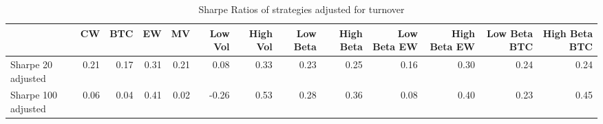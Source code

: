 \begin{table}
\centering
\caption{Sharpe Ratios of strategies adjusted for turnover}
\label{sharpe}
\begin{tabular}{lrrrrrrrrrrrr}
\toprule
{} &   CW &  BTC &   EW &   MV &  Low Vol &  High Vol &  Low Beta &  High Beta &  Low Beta EW &  High Beta EW &  Low Beta BTC &  High Beta BTC \\
\midrule
Sharpe 20 adjusted  & 0.21 & 0.17 & 0.31 & 0.21 &     0.08 &      0.33 &      0.23 &       0.25 &         0.16 &          0.30 &          0.24 &           0.24 \\
Sharpe 100 adjusted & 0.06 & 0.04 & 0.41 & 0.02 &    -0.26 &      0.53 &      0.28 &       0.36 &         0.08 &          0.40 &          0.23 &           0.45 \\
\bottomrule
\end{tabular}
\end{table}
